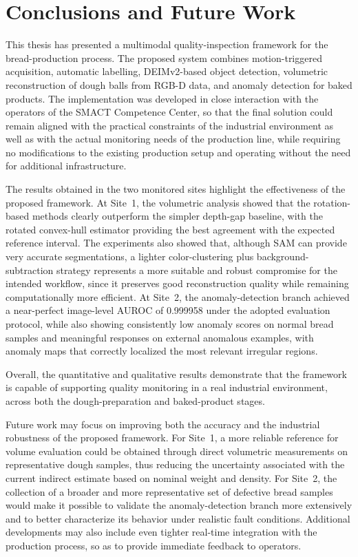 
\chapter{Conclusions and Future Work}
This thesis has presented a multimodal quality-inspection framework for the bread-production process. The proposed system combines motion-triggered acquisition, automatic labelling, DEIMv2-based object detection, volumetric reconstruction of dough balls from RGB-D data, and anomaly detection for baked products. The implementation was developed in close interaction with the operators of the SMACT \cite{smact_official_2026} Competence Center, so that the final solution could remain aligned with the practical constraints of the industrial environment as well as with the actual monitoring needs of the production line, while requiring no modifications to the existing production setup and operating without the need for additional infrastructure.

The results obtained in the two monitored sites highlight the effectiveness of the proposed framework. At Site~1, the volumetric analysis showed that the rotation-based methods clearly outperform the simpler depth-gap baseline, with the rotated convex-hull estimator providing the best agreement with the expected reference interval. The experiments also showed that, although SAM can provide very accurate segmentations, a lighter color-clustering plus background-subtraction strategy represents a more suitable and robust compromise for the intended workflow, since it preserves good reconstruction quality while remaining computationally more efficient.
At Site~2, the anomaly-detection branch achieved a near-perfect image-level AUROC of 0.999958 under the adopted evaluation protocol, while also showing consistently low anomaly scores on normal bread samples and meaningful responses on external anomalous examples, with anomaly maps that correctly localized the most relevant irregular regions.

Overall, the quantitative and qualitative results demonstrate that the framework is capable of supporting quality monitoring in a real industrial environment, across both the dough-preparation and baked-product stages.

Future work may focus on improving both the accuracy and the industrial robustness of the proposed framework. For Site~1, a more reliable reference for volume evaluation could be obtained through direct volumetric measurements on representative dough samples, thus reducing the uncertainty associated with the current indirect estimate based on nominal weight and density. For Site~2, the collection of a broader and more representative set of defective bread samples would make it possible to validate the anomaly-detection branch more extensively and to better characterize its behavior under realistic fault conditions. Additional developments may also include even tighter real-time integration with the production process, so as to provide immediate feedback to operators.
